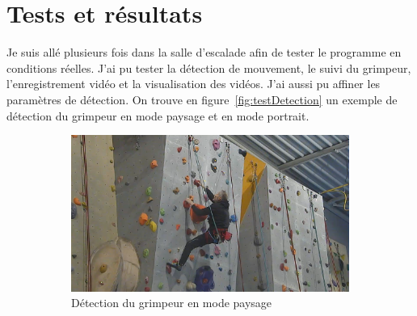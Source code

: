 \documentclass[a4paper, 11pt, french]{article}
\begin{document}
\section{Tests et résultats}
Je suis allé plusieurs fois dans la salle d'escalade afin de tester le programme en conditions réelles. J'ai pu tester la détection de mouvement, le suivi du grimpeur, l'enregistrement vidéo et la visualisation des vidéos. J'ai aussi pu affiner les paramètres de détection. On trouve en figure~\ref{fig:testDetection} un exemple de détection du grimpeur en mode paysage et en mode portrait.

\begin{figure}[!ht]
     \begin{center}
        \begin{subfigure}[t]{0.70\textwidth}
            \includegraphics[width=\textwidth]{exemplePaysage.png}
            \caption{Détection du grimpeur en mode paysage}
            \label{fig:test1}
        \end{subfigure}
        \begin{subfigure}[t]{0.22\textwidth}
            \centering

\end{subfigure}
\end{center}
\end{figure}
\end{document}
